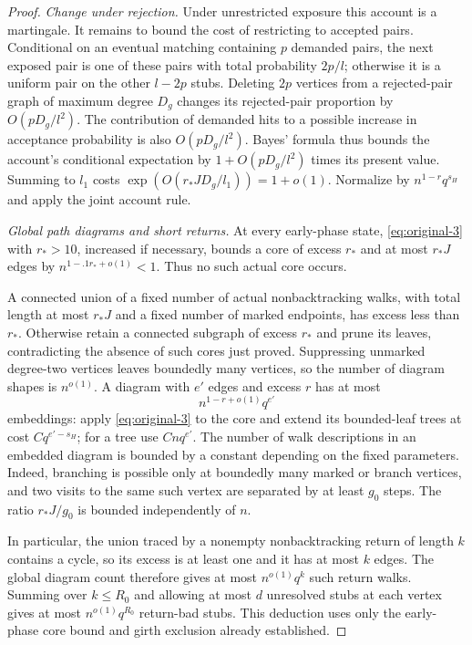 \begin{proof}
\emph{Change under rejection.}
Under unrestricted exposure this account is a martingale. It remains
to bound the cost of restricting to accepted pairs. Conditional on an
eventual matching
containing $p$ demanded pairs, the next exposed pair is one of these
pairs with total probability $2p/l$; otherwise it is a uniform pair
on the other $l-2p$ stubs. Deleting $2p$ vertices from a rejected-pair
graph of maximum degree $D_g$ changes its rejected-pair proportion by
$O(pD_g/l^2)$. The contribution of demanded hits to a possible
increase in acceptance probability is also $O(pD_g/l^2)$. Bayes'
formula thus bounds the account's conditional expectation by
$1+O(pD_g/l^2)$ times its present value. Summing to $l_1$ costs
$\exp(O(r_*JD_g/l_1))=1+o(1)$. Normalize by
$n^{1-r}q^{s_H}$ and apply the joint account rule.

\emph{Global path diagrams and short returns.}
At every early-phase state, \eqref{eq:original-3} with $r_*>10$,
increased if necessary, bounds a core of excess $r_*$ and at most
$r_*J$ edges by $n^{1-.1r_*+o(1)}<1$. Thus no such actual core occurs.

A connected union of a fixed number of actual nonbacktracking walks,
with total length at most $r_*J$ and a
fixed number of marked endpoints, has excess less than $r_*$. Otherwise
retain a connected subgraph of excess $r_*$ and prune its leaves,
contradicting the absence of such cores just proved. Suppressing unmarked
degree-two vertices leaves boundedly many vertices, so the number of
diagram shapes is $n^{o(1)}$. A diagram with $e'$ edges and excess $r$
has at most
\[
 n^{1-r+o(1)}q^{e'}
\]
embeddings: apply \eqref{eq:original-3} to the core and extend its
bounded-leaf trees at cost $Cq^{e'-s_H}$; for a tree use $Cnq^{e'}$.
The number of walk descriptions in an embedded diagram is bounded by
a constant depending on the fixed parameters. Indeed, branching is
possible only at boundedly many marked or branch vertices, and two
visits to the same such vertex are separated by at least $g_0$ steps.
The ratio $r_*J/g_0$ is bounded independently of $n$.

In particular, the union traced by a nonempty nonbacktracking return
of length $k$ contains a cycle, so its excess is at least one and it has
at most $k$ edges. The global diagram count therefore gives at most
$n^{o(1)}q^k$ such return walks. Summing over $k\le R_0$ and allowing
at most $d$ unresolved stubs at each vertex gives at most
$n^{o(1)}q^{R_0}$ return-bad stubs. This deduction uses only the
early-phase core bound and girth exclusion already established.


\end{proof}

